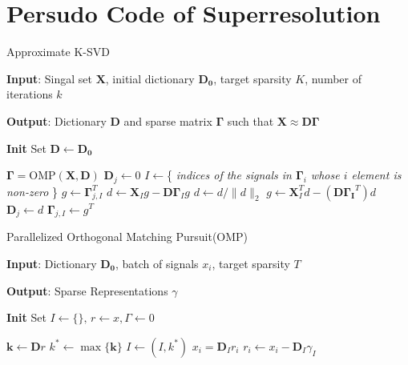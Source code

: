 \documentclass{article}
\begin{document}
\section{Persudo Code of Superresolution}
\begin{algorithm}[H]
	\caption{Approximate K-SVD} 
	\label{alg1}
	\begin{algorithmic}
            \STATE \textbf{Input}: Singal set \(\mathbf{X}\), initial dictionary \(\mathbf{D_0}\), target sparsity \(K\), number of iterations \(k\)   
            
            \STATE \textbf{Output}: Dictionary \(\mathbf{D}\) and sparse matrix \(\mathbf{\Gamma}\) such that \(\mathbf{X}\approx\mathbf{D\Gamma}\)
            
            \STATE \textbf{Init} Set \(\mathbf{D}\leftarrow\mathbf{D_0}\)
            
	             \STATE \(\mathbf{\Gamma}=\mathrm{OMP}(\mathbf{X},\mathbf{D})\)
		             \STATE \(\mathbf{D}_j\leftarrow0\)
		             \STATE \(I\leftarrow\)\{ \textsl{indices of the signals in \(\mathbf{\Gamma}_i\) whose \(i\) element is non-zero}  \}
		             \STATE \(g\leftarrow\mathbf{\Gamma}^T_{j,I}\)
		             \STATE \(d \leftarrow \mathbf{X}_{I}g - \mathbf{D\Gamma}_{I}g\)
		             \STATE \(d \leftarrow d/\lVert d\rVert_2\)
		             \STATE \(g \leftarrow \mathbf{X}_I^Td-(\mathbf{D\Gamma_I}^T)d\)
		             \STATE \(\mathbf{D}_j \leftarrow d  \)
		             \STATE \(\mathbf{\Gamma}_{j,I} \leftarrow g^T \)
	             \ENDFOR
            \ENDFOR
            
	\end{algorithmic}
\end{algorithm}


\begin{algorithm}[H]
	\caption{Parallelized Orthogonal Matching Pursuit(OMP)} 
	\label{alg2}
	\begin{algorithmic}
		\STATE \textbf{Input}: Dictionary \(\mathbf{D_0}\), batch of signals \(x_i\), target sparsity \(T\)   
		
		\STATE \textbf{Output}: Sparse Representations \(\gamma\) 
		
		\STATE \textbf{Init} Set \(I\leftarrow\{\},\,r\leftarrow x,\Gamma\leftarrow0\)
	
		\FOR {\(i=1,\dots,T\)}
			\STATE \(\mathbf{k}\leftarrow \mathbf{D}r \)
			\STATE \(k^* \leftarrow \max{\{\mathbf{k}\}}\)
			\STATE \(I \leftarrow (I,k^*)\)
			\STATE \(x_i = \mathbf{D}_Ir_i\)
			\STATE \(r_i\leftarrow x_i - \mathbf{D}_I\gamma_I\) 
		\ENDFOR
	\end{algorithmic}
\end{algorithm}
\end{document}

